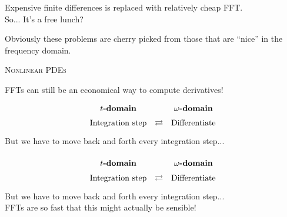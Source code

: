\documentclass[14pt]{beamer}
\begin{document}
\begin{frame}
    \centering
    \tiny Expensive finite differences is replaced with relatively cheap FFT.\\[1em]
    \pause
    \small So... It's a free lunch?
\end{frame}

\begin{frame}
    \centering
    Obviously these problems are cherry picked from those that are ``nice''
    in the frequency domain.
\end{frame}

\begin{frame}
    \centering
    \textsc{Nonlinear PDEs}



\end{frame}

\begin{frame}
    \centering
    \small
    FFTs can still be an economical way to compute derivatives!\\[1em]
    $$
    \def\arraystretch{1.5}
    \begin{array}{ccc}
        t\text{\bf-domain} & & \omega\text{\bf-domain}\\
        \text{Integration step} & \rightleftarrows & \text{Differentiate}
    \end{array}
    $$
    \tiny
    But we have to move back and forth every integration step...
\end{frame}

\begin{frame}
    \centering
    $$
    \def\arraystretch{1.5}
    \begin{array}{ccc}
        t\text{\bf-domain} & & \omega\text{\bf-domain}\\
        \text{Integration step} & \rightleftarrows & \text{Differentiate}
    \end{array}
    $$
    \tiny
    But we have to move back and forth every integration step...\\[2em]

    \small
    FFTs are so fast that this might actually be sensible!
\end{frame}
\end{document}
